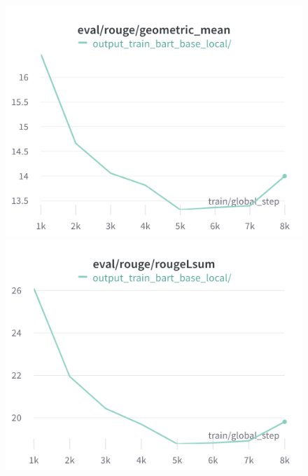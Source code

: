 \documentclass{article}
\begin{document}
\begin{figure}[!htb]
\includegraphics[width=\linewidth]{charts/Section-6-Panel-0-5w7pojrrj}
\caption{}
\endminipage\hfill
{}
\includegraphics[width=\linewidth]{charts/Section-6-Panel-1-u7oototqm}
\caption{}
\endminipage
\end{figure}
\end{document}
